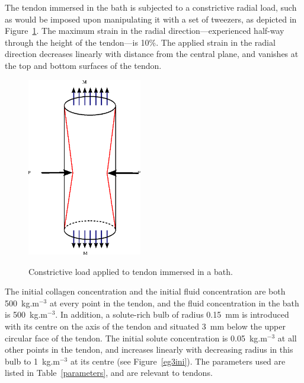The tendon immersed in the bath is subjected to a constrictive
radial load, such
as would be imposed upon  manipulating it with a set of tweezers, as depicted in
Figure~\ref{constrictload}. The
maximum strain in the radial 
direction---experienced half-way through the height of the tendon---is
10\%. The applied strain in the radial direction decreases linearly
with distance from the central plane, and vanishes at the top and
bottom surfaces of the tendon. 


\begin{figure}[ht]
  \centering
         {\includegraphics[width=5.0cm]{images/cylinder-in-bath.eps}}
	 \caption{Constrictive load applied to tendon immersed in a
	 bath.} 
	 \label{constrictload}
\end{figure}

The 
initial collagen concentration and the initial fluid concentration are
both 500~kg.m$^{-3}$ at every point in the tendon, and the fluid
concentration in the bath is 500~kg.m$^{-3}$. In
addition, a solute-rich bulb of radius 0.15~mm is introduced with
its centre on the axis of the tendon and situated 3~mm below the upper
circular face of the tendon. The initial solute concentration is
0.05~kg.m$^{-3}$ at all other points in the tendon, and increases
linearly with decreasing radius in this bulb to 1~kg.m$^{-3}$ at its
centre (see Figure~\ref{eg3ini}). The
parameters used are listed in Table~\ref{parameters}, and are relevant
to tendons.

